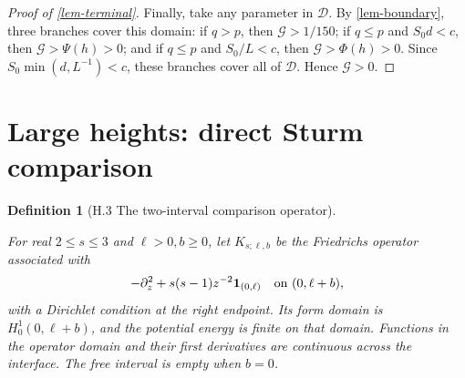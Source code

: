 \documentclass[11pt,a4paper]{article}
\theoremstyle{proofmanuscript}
\newtheorem{definition}[theorem]{Definition}
\begin{document}
\begin{proof}[Proof of \ref{lem-terminal}]
Finally, take any parameter in \(\mathcal D\). By \ref{lem-boundary}, three branches cover this domain: if \(q>p\), then \(\mathcal G>1/150\); if \(q\le p\) and \(S_0d<c\), then \(\mathcal G>\Psi(h)>0\); and if \(q\le p\) and \(S_0/L<c\), then \(\mathcal G>\Phi(h)>0\). Since \(S_0\min(d,L^{-1})<c\), these branches cover all of \(\mathcal D\). Hence \(\mathcal G>0\).

\end{proof}


\section{Large heights: direct Sturm comparison}

\begin{definition}[H.3 The two-interval comparison operator]\label{def-high-operator}

For real \(2\le s\le3\) and \(\ell>0,b\ge0\), let \(K_{s;\ell,b}\) be the Friedrichs operator associated with \[
-\partial_z^2+s(s-1)z^{-2}\mathbf1_{(0,\ell)}
\quad\hbox{on }(0,\ell+b),
\] with a Dirichlet condition at the right endpoint. Its form domain is \(H_0^1(0,\ell+b)\), and the potential energy is finite on that domain. Functions in the operator domain and their first derivatives are continuous across the interface. The free interval is empty when \(b=0\).

\end{definition}
\end{document}
